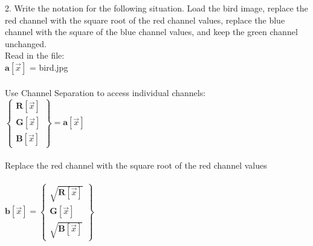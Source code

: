 \documentclass[12pt]{article}
\begin{document}
2.	Write the notation for the following situation. Load the bird image, replace the red channel with the square root of the red channel values, replace the blue channel with the square of the blue channel values, and keep the green channel unchanged.\\

Read in the file:\\
$ \boldsymbol{a}[\vec{x}]$ = bird.jpg\\\\
Use Channel Separation to access individual channels:\\
$
\begin{Bmatrix} 
\boldsymbol{R}[\vec{x}]\\ 
\boldsymbol{G}[\vec{x}] \\ 
\boldsymbol{B}[\vec{x}]  
\end{Bmatrix} = \boldsymbol{a}[\vec{x}]$  \\\\
Replace the red channel with the square root of the red channel values\\\\
$\boldsymbol{b}[\vec{x}] =
\begin{Bmatrix} 
\sqrt{\boldsymbol{R}[\vec{x}]}\\ 
\boldsymbol{G}[\vec{x}] \\ 
\sqrt{\boldsymbol{B}[\vec{x}]}  
\end{Bmatrix}$ \\ 

\vspace{5mm}
\end{document}
